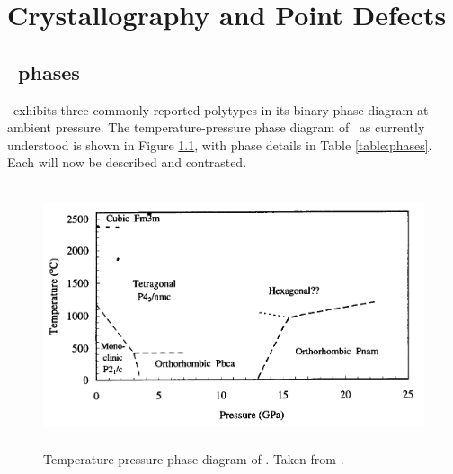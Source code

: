 \chapter{Crystallography and Point Defects}

\label{ch:crystallography}

\section{\zirconia\ phases}
{
\zirconia\ exhibits three commonly reported polytypes in its binary phase diagram at ambient pressure. The temperature-pressure phase diagram of \zirconia\ as currently understood is shown in Figure \ref{figure:currentphasediagram}, with phase details in Table \ref{table:phases}. Each will now be described and contrasted.
}

\begin{figure}[ht] %
\centering
\includegraphics[height=7.7cm]{images/current_phase_diagram.png}
\caption[Temperature-pressure phase diagram of \zirconia .]{Temperature-pressure phase diagram of \zirconia . Taken from \cite{kisi1998crystal}.
\label{figure:currentphasediagram}}
\end{figure}

